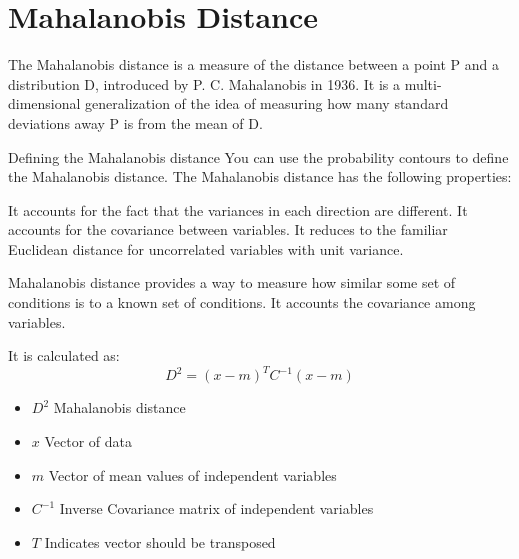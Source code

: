 \documentclass[11pt]{article} %
\begin{document}
\section*{Mahalanobis Distance}
The Mahalanobis distance is a measure of the distance between a point P and a distribution D, introduced by P. C. Mahalanobis in 1936. It is a multi-dimensional generalization of the idea of measuring 
how many standard deviations away P is from the mean of D.



Defining the Mahalanobis distance
You can use the probability contours to define the Mahalanobis distance. The Mahalanobis distance has the following properties:

It accounts for the fact that the variances in each direction are different.
It accounts for the covariance between variables.
It reduces to the familiar Euclidean distance for uncorrelated variables with unit variance.
\newpage

Mahalanobis distance provides a way to measure how similar some set of conditions is to a known set of conditions. It accounts the covariance among variables.

It is calculated as:
\[D^2=(x-m)^TC^{-1}(x-m)\]
\begin{itemize}
\item $D^2$ Mahalanobis distance
\item $x$ Vector of data
\item $m$ Vector of mean values of independent variables
\item $C^{-1}$ Inverse Covariance matrix of independent variables
\item $T$ Indicates vector should be transposed
\end{itemize}
\end{document}
